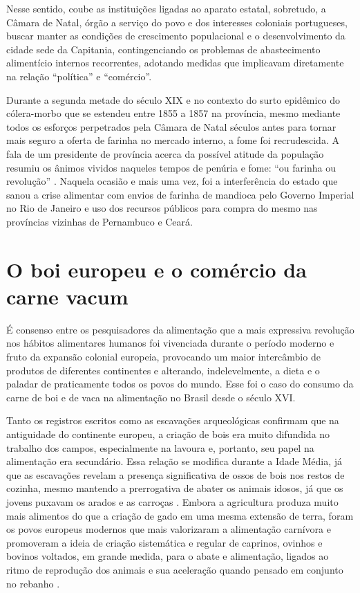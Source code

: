 \begin{refsection}
Nesse sentido, coube as instituições ligadas ao aparato estatal, sobretudo, a Câmara de Natal, órgão a serviço do povo e dos interesses coloniais portugueses, buscar manter as condições de crescimento populacional e o desenvolvimento da cidade sede da Capitania, contingenciando os problemas de abastecimento alimentício internos recorrentes, adotando medidas que implicavam diretamente na relação ``política'' e ``comércio''. 

Durante a segunda metade do século XIX e no contexto do surto epidêmico do cólera-morbo que se estendeu entre 1855 a 1857 na província, mesmo mediante todos os esforços perpetrados pela Câmara de Natal séculos antes para tornar mais seguro a oferta de farinha no mercado interno, a fome foi recrudescida. A fala de um presidente de província acerca da possível atitude da população resumiu os ânimos vividos naqueles tempos de penúria e fome: “ou farinha ou revolução” \cite[p.~117]{Monteiro2007terra}. Naquela ocasião e mais uma vez, foi a interferência do estado que sanou a crise alimentar com envios de farinha de mandioca pelo Governo Imperial no Rio de Janeiro e uso dos recursos públicos para compra do mesmo nas províncias vizinhas de Pernambuco e Ceará.

\section{O boi europeu e o comércio da carne vacum}

É consenso entre os pesquisadores da alimentação que a mais expressiva revolução nos hábitos alimentares humanos foi vivenciada durante o período moderno e fruto da expansão colonial europeia, provocando um maior intercâmbio de produtos de diferentes continentes e alterando, indelevelmente, a dieta e o paladar de praticamente todos os povos do mundo. Esse foi o caso do consumo da carne de boi e de vaca na alimentação no Brasil desde o século XVI.

Tanto os registros escritos como as escavações arqueológicas confirmam que na antiguidade do continente europeu, a criação de bois era muito difundida no trabalho dos campos, especialmente na lavoura e, portanto, seu papel na alimentação era secundário. Essa relação se modifica durante a Idade Média, já que as escavações revelam a presença significativa de ossos de bois nos restos de cozinha, mesmo mantendo a prerrogativa de abater os animais idosos, já que os jovens puxavam os arados e as carroças \cite{Flandrin1998historia}. Embora a agricultura produza muito mais alimentos do que a criação de gado em uma mesma extensão de terra, foram os povos europeus modernos que mais valorizaram a alimentação carnívora e promoveram a ideia de criação sistemática e regular de caprinos, ovinhos e bovinos voltados, em grande medida, para o abate e alimentação, ligados ao ritmo de reprodução dos animais e sua aceleração quando pensado em conjunto no rebanho \cite{Carneiro2003comida}.


\end{refsection}
